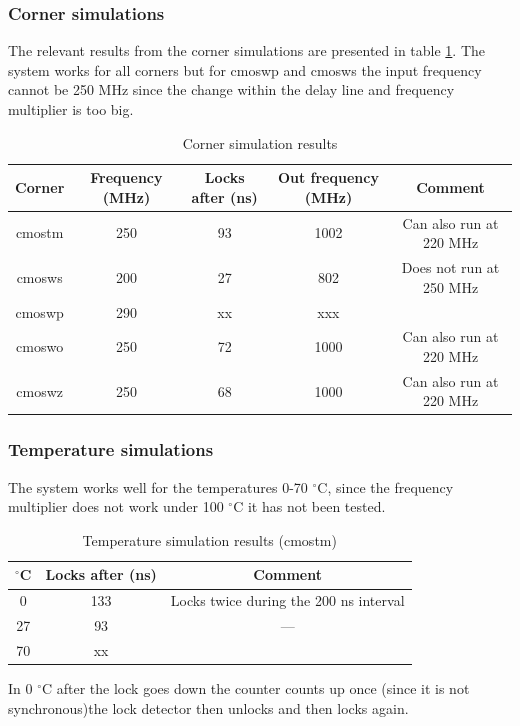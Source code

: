 \documentclass[a4paper,12pt]{article} \usepackage{graphicx}
\newcommand{\degree}{\ensuremath{^\circ}}
\begin{document}
\subsubsection{Corner simulations}
The relevant results from the corner simulations are presented in
table \ref{tab:WS_corner}. The system works for all corners but
for cmoswp and cmosws the input frequency cannot be 250 MHz since the
change within the delay line and frequency multiplier is too big. 
\begin{table}[h]
        \centering
        \begin{tabular}{|c|c|c|c|c|}
                \hline
                \textbf{Corner} & \textbf{Frequency (MHz)} &
                \textbf{Locks after (ns)} & \textbf{Out frequency
                  (MHz)} & \textbf{Comment}\\
                \hline
                cmostm & 250 & 93 & 1002 & Can also run at 220 MHz \\
                cmosws & 200 & 27 & 802  & Does not run at 250 MHz \\
                cmoswp & 290 & xx & xxx  & \\
                cmoswo & 250 & 72 & 1000 & Can also run at 220 MHz \\
                cmoswz & 250 & 68 & 1000 & Can also run at 220 MHz \\
                \hline
        \end{tabular}
        \caption{Corner simulation results}
        \label{tab:WS_corner}
\end{table}
\subsubsection{Temperature simulations}
The system works well for the temperatures 0-70 \degree C, since the
frequency multiplier does not work under 100 \degree C it has not been
tested.
  
\begin{table}[h]
        \centering
        \begin{tabular}{|c|c|c|}
          \hline
          \textbf{\degree C} & \textbf{Locks after (ns)} & \textbf{Comment} \\
          \hline
          0  & 133 & Locks twice during the 200 ns interval \\
          27 & 93 & ---\\
          70 & xx & \\
          \hline
        \end{tabular}
        \caption{Temperature simulation results (cmostm)}
        \label{tab:WS_temp}
      \end{table}
In 0 \degree C after the lock goes down the counter counts up once
(since it is not synchronous)the lock detector then unlocks and then
locks again.  
\end{document}
